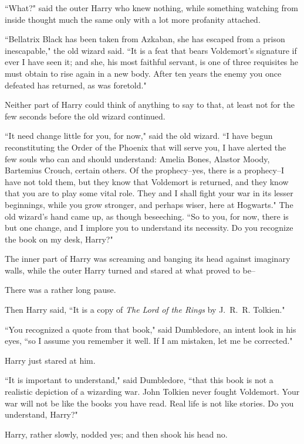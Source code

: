 ``What?" said the outer Harry who knew nothing, while something watching from inside thought much the same only with a lot more profanity attached.

``Bellatrix Black has been taken from Azkaban, she has escaped from a prison inescapable," the old wizard said. ``It is a feat that bears Voldemort's signature if ever I have seen it; and she, his most faithful servant, is one of three requisites he must obtain to rise again in a new body. After ten years the enemy you once defeated has returned, as was foretold."

Neither part of Harry could think of anything to say to that, at least not for the few seconds before the old wizard continued.

``It need change little for you, for now," said the old wizard. ``I have begun reconstituting the Order of the Phoenix that will serve you, I have alerted the few souls who can and should understand: Amelia Bones, Alastor Moody, Bartemius Crouch, certain others. Of the prophecy\---yes, there is a prophecy\---I have not told them, but they know that Voldemort is returned, and they know that you are to play some vital role. They and I shall fight your war in its lesser beginnings, while you grow stronger, and perhaps wiser, here at Hogwarts." The old wizard's hand came up, as though beseeching. ``So to you, for now, there is but one change, and I implore you to understand its necessity. Do you recognize the book on my desk, Harry?"

The inner part of Harry was screaming and banging its head against imaginary walls, while the outer Harry turned and stared at what proved to be\---

There was a rather long pause.

Then Harry said, ``It is a copy of \emph{The Lord of the Rings} by J.~R.~R. Tolkien."

``You recognized a quote from that book," said Dumbledore, an intent look in his eyes, ``so I assume you remember it well. If I am mistaken, let me be corrected."

Harry just stared at him.

``It is important to understand," said Dumbledore, ``that this book is not a realistic depiction of a wizarding war. John Tolkien never fought Voldemort. Your war will not be like the books you have read. Real life is not like stories. Do you understand, Harry?"

Harry, rather slowly, nodded yes; and then shook his head no.

